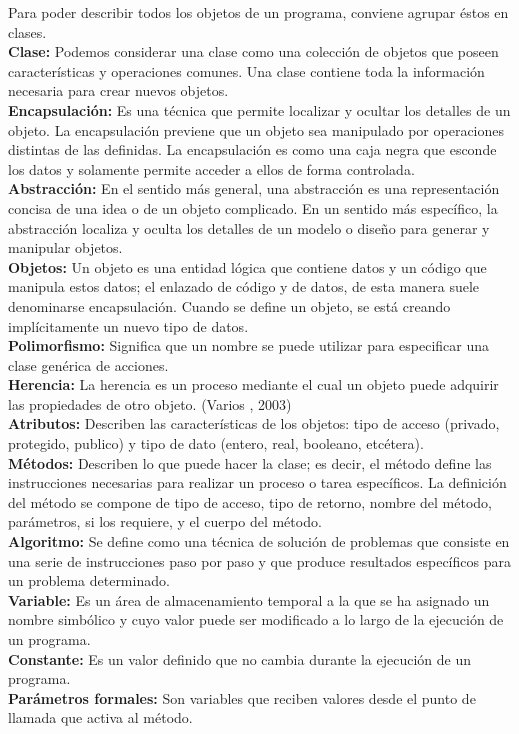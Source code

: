 Para poder describir todos los objetos de un programa, conviene agrupar éstos en clases. 
\\
\textbf{Clase:} Podemos considerar una clase como una colección de objetos que poseen características y operaciones comunes. Una clase contiene toda la información necesaria para crear nuevos objetos. 
\\
\textbf{Encapsulación:} Es una técnica que permite localizar y ocultar los detalles de un objeto. La encapsulación previene que un objeto sea manipulado por operaciones distintas de las definidas. La encapsulación es como una caja negra que esconde los datos y solamente permite acceder a ellos de forma controlada.
\\
\textbf{Abstracción:} En el sentido más general, una abstracción es una representación concisa de una idea o de un objeto complicado. En un sentido más específico, la abstracción localiza y oculta los detalles de un modelo o diseño para generar y manipular objetos.
\\
\textbf{Objetos:} Un objeto es una entidad lógica que contiene datos y un código que manipula estos datos; el enlazado de código y de datos, de esta manera suele denominarse encapsulación. 
Cuando se define un objeto, se está creando implícitamente un nuevo tipo de datos. 
\\
\textbf{Polimorfismo:} Significa que un nombre se puede utilizar para especificar una clase genérica de acciones. 
\\
\textbf{Herencia:} La herencia es un proceso mediante el cual un objeto puede adquirir las propiedades de otro objeto. (Varios , 2003)
\\
\textbf{Atributos:} Describen las características de los objetos: tipo de acceso (privado, protegido, publico) y tipo de dato (entero, real, booleano, etcétera).
\\
\textbf{Métodos:} Describen lo que puede hacer la clase; es decir, el método define las instrucciones necesarias para realizar un proceso o tarea específicos. La definición del método se compone de tipo de acceso, tipo de retorno, nombre del método, parámetros, si los requiere, y el cuerpo del método.
\\
\textbf{Algoritmo:} Se define como una técnica de solución de problemas que consiste en una serie de instrucciones paso por paso y que produce resultados específicos para un problema determinado.
\\
\textbf{Variable:} Es un área de almacenamiento temporal a la que se ha asignado un nombre simbólico y cuyo valor puede ser modificado a lo largo de la ejecución de un programa.
\\
\textbf{Constante:} Es un valor definido que no cambia durante la ejecución de un programa.
\\
\textbf{Parámetros formales:} Son variables que reciben valores desde el punto de llamada que activa al método.
